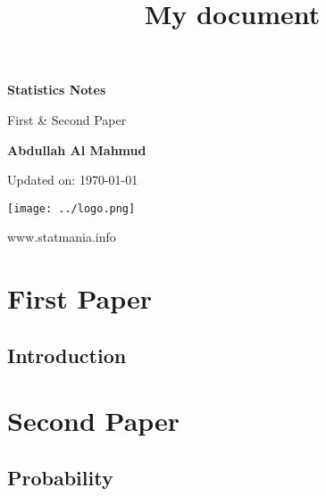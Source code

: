 \documentclass[14pt, a4paper,oneside, margin=1.4in]{book}
\title{My document}
\begin{document}
\frontmatter

\begin{titlepage}
    \begin{center}
        \vspace*{1cm}
            
        \Huge
        \textbf{Statistics Notes}
            
        \vspace{0.5cm}
        \huge
        First \& Second Paper
            
        \vspace{1.5cm}
            
        \textbf{Abdullah Al Mahmud}

     \vspace{1.5cm}

	\Large 
	Updated on: \today
            
        \vfill
            

            
        \vspace{0.8cm}
            
\texttt{[image: ../logo.png]}
            
        \Large
        www.statmania.info\\
            
    \end{center}
\end{titlepage}


\tableofcontents


\mainmatter
\part {First Paper}

\chapter{Introduction}

\part {Second Paper}
\chapter{Probability} 
\end{document}
